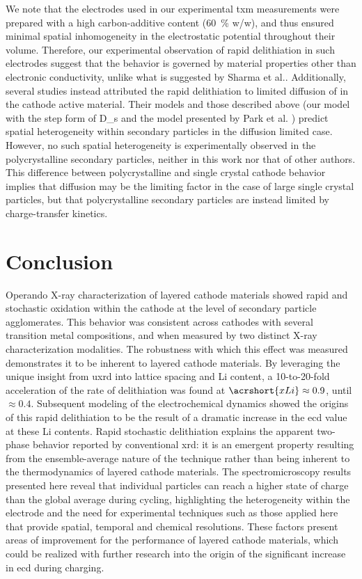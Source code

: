 \documentclass{article}
\begin{document}
We note that the electrodes used in our experimental \gls{txm}
measurements were prepared with a high carbon-additive content
(\SI{60}{\percent} w/w), and thus ensured minimal spatial
inhomogeneity in the electrostatic potential throughout their
volume. Therefore, our experimental observation of rapid delithiation
in such electrodes suggest that the behavior is governed by material
properties other than electronic conductivity, unlike what is
suggested by Sharma et al.\cite{zhao2022}. Additionally, several
studies instead attributed the rapid delithiation to limited diffusion
of  in the cathode active material\cite{rao2021,
  wang2020-6}. Their models and those described above (our model with
the step form of \gls{D_s} and the model presented by Park et
al. \cite{chueh2021}) predict spatial heterogeneity within secondary
particles in the diffusion limited case\cite{wang2020-6}. However, no
such spatial heterogeneity is experimentally observed in the
polycrystalline secondary particles, neither in this work nor that of
other authors\cite{chueh2021, zhao2022}. This difference between
polycrystalline and single crystal cathode behavior implies that
 diffusion may be the limiting factor in the case of large
single crystal particles, but that polycrystalline secondary particles
are instead limited by charge-transfer kinetics.
 



\section{Conclusion}

Operando X-ray characterization of layered cathode materials showed
rapid and stochastic oxidation within the cathode at the level of
secondary particle agglomerates. This behavior was consistent across
cathodes with several transition metal compositions, and when measured
by two distinct X-ray characterization modalities. The robustness with
which this effect was measured demonstrates it to be inherent to
layered cathode materials. By leveraging the unique insight from
\gls{uxrd} into lattice spacing and Li content, a 10-to-20-fold
acceleration of the rate of delithiation was found at $\acrshort{xLi}
\approx 0.9$, until $\approx 0.4$. Subsequent modeling of the
electrochemical dynamics showed the origins of this rapid delithiation
to be the result of a dramatic increase in the \gls{ecd} value at
these Li contents. Rapid stochastic delithiation explains the apparent
two-phase behavior reported by conventional \gls{xrd}: it is an
emergent property resulting from the ensemble-average nature of the
technique rather than being inherent to the thermodynamics of layered
cathode materials. The spectromicroscopy results presented here reveal
that individual particles can reach a higher state of charge than the
global average during cycling, highlighting the heterogeneity within
the electrode and the need for experimental techniques such as those
applied here that provide spatial, temporal and chemical
resolutions. These factors present areas of improvement for the
performance of layered cathode materials, which could be realized with
further research into the origin of the significant increase in
\gls{ecd} during charging.
\end{document}
